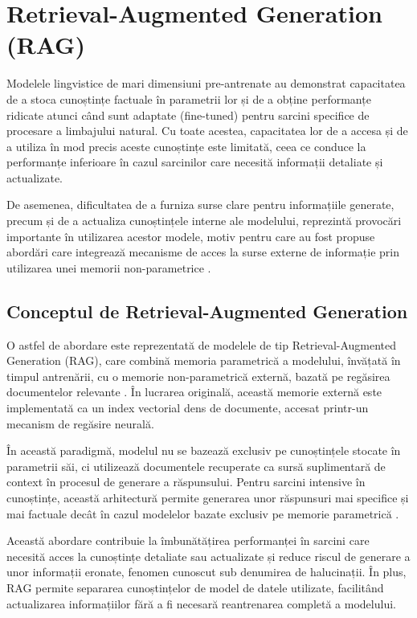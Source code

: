 \documentclass[12pt, a4paper, oneside, romanian]{teza-upb}
\begin{document}
\section{Retrieval-Augmented Generation (RAG)}

Modelele lingvistice de mari dimensiuni pre-antrenate au demonstrat capacitatea de a stoca cunoștințe factuale în parametrii lor și de a obține performanțe ridicate atunci când sunt adaptate (fine-tuned) pentru sarcini specifice de procesare a limbajului natural. Cu toate acestea, capacitatea lor de a accesa și de a utiliza în mod precis aceste cunoștințe este limitată, ceea ce conduce la performanțe inferioare în cazul sarcinilor care necesită informații detaliate și actualizate.

De asemenea, dificultatea de a furniza surse clare pentru informațiile generate, precum și de a actualiza cunoștințele interne ale modelului, reprezintă provocări importante în utilizarea acestor modele, motiv pentru care au fost propuse abordări care integrează mecanisme de acces la surse externe de informație prin utilizarea unei memorii non-parametrice \cite{lewis2020retrieval}.



\subsection{Conceptul de Retrieval-Augmented Generation}

O astfel de abordare este reprezentată de modelele de tip Retrieval-Augmented Generation (RAG), care combină memoria parametrică a modelului, învățată în timpul antrenării, cu o memorie non-parametrică externă, bazată pe regăsirea documentelor relevante \cite{lewis2020retrieval}. În lucrarea originală, această memorie externă este implementată ca un index vectorial dens de documente, accesat printr-un mecanism de regăsire neurală.

În această paradigmă, modelul nu se bazează exclusiv pe cunoștințele stocate în parametrii săi, ci utilizează documentele recuperate ca sursă suplimentară de context în procesul de generare a răspunsului. Pentru sarcini intensive în cunoștințe, această arhitectură permite generarea unor răspunsuri mai specifice și mai factuale decât în cazul modelelor bazate exclusiv pe memorie parametrică \cite{lewis2020retrieval}.

Această abordare contribuie la îmbunătățirea performanței în sarcini care necesită acces la cunoștințe detaliate sau actualizate și reduce riscul de generare a unor informații eronate, fenomen cunoscut sub denumirea de halucinații. În plus, RAG permite separarea cunoștințelor de model de datele utilizate, facilitând actualizarea informațiilor fără a fi necesară reantrenarea completă a modelului.
\end{document}
